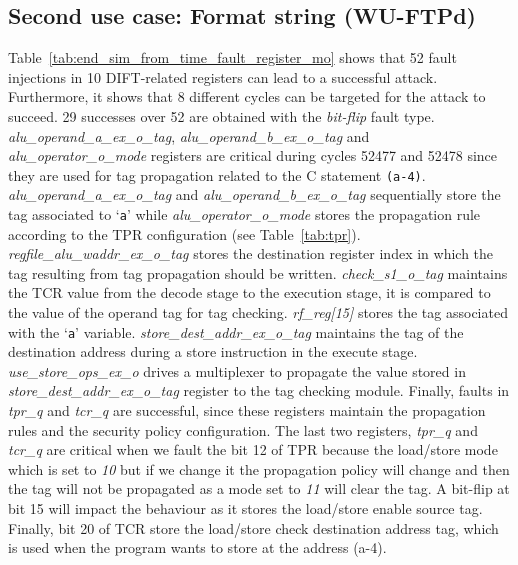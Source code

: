 \subsection{Second use case: Format string (WU-FTPd)}
Table~\ref{tab:end_sim_from_time_fault_register_mo} shows that 52 fault injections in 10 DIFT-related registers can lead to a successful attack. 
Furthermore, it shows that 8 different cycles can be targeted for the attack to succeed. 29 successes over 52 are obtained with the \textit{bit-flip} fault type. 
\textit{alu\_operand\_a\_ex\_o\_tag}, \textit{alu\_operand\_b\_ex\_o\_tag} and \textit{alu\_operator\_o\_mode} registers are critical during cycles 52477 and 52478 since they are used for tag propagation related to the C statement \verb|(a-4)|. \textit{alu\_operand\_a\_ex\_o\_tag} and \textit{alu\_operand\_b\_ex\_o\_tag} sequentially store the tag associated to `\verb|a|' while \textit{alu\_operator\_o\_mode} stores the propagation rule according to the TPR configuration (see Table~\ref{tab:tpr}). \textit{regfile\_alu\_waddr\_ex\_o\_tag} stores the destination register index in which the tag resulting from tag propagation should be written.
\textit{check\_s1\_o\_tag} maintains the TCR value from the decode stage to the execution stage, it is compared to the value of the operand tag for tag checking.
\textit{rf\_reg[15]} stores the tag associated with the `\verb|a|' variable.
\textit{store\_dest\_addr\_ex\_o\_tag} maintains the tag of the destination address during a store instruction in the execute stage. 
\textit{use\_store\_ops\_ex\_o} drives a multiplexer to propagate the value stored in \textit{store\_dest\_addr\_ex\_o\_tag} register to the tag checking module.
Finally, faults in \textit{tpr\_q} and \textit{tcr\_q} are successful, since these registers maintain the propagation rules and the security policy configuration. 
The last two registers, \textit{tpr\_q} and \textit{tcr\_q} are critical when we fault the bit 12 of TPR because the load/store mode which is set to \textit{10} but if we change it the propagation policy will change and then the tag will not be propagated as a mode set to \textit{11} will clear the tag. A bit-flip at bit 15 will impact the behaviour as it stores the load/store enable source tag. Finally, bit 20 of TCR store the load/store check destination address tag, which is used when the program wants to store at the address (a-4).

